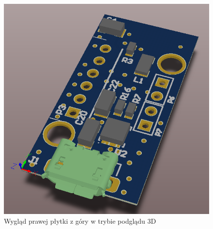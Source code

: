 \begin{figure}[H]
	\centering
	\includegraphics[scale=0.4]{zdjecia/PCB/PCB_right_3D.png}
	\caption{\label{PCB_right_3D} Wygląd prawej płytki z góry w trybie podglądu 3D}
\end{figure}
